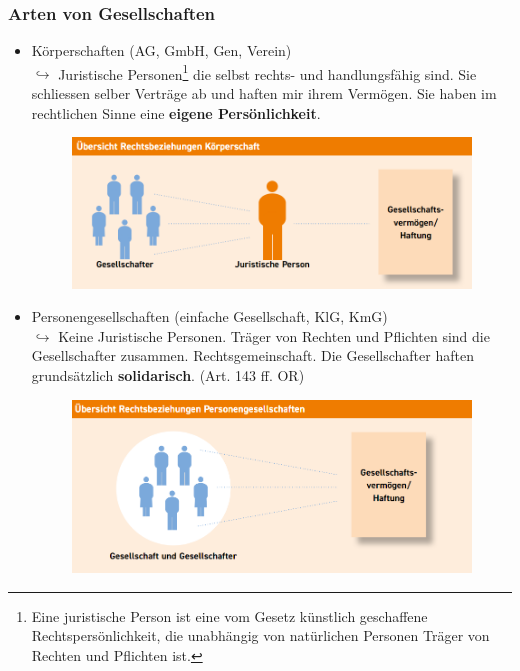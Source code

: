 \documentclass[12pt]{article}
\begin{document}
\newpage
\subsubsection{Arten von Gesellschaften}
\begin{itemize}
    \item Körperschaften (AG, GmbH, Gen, Verein)\\
    $\hookrightarrow$ Juristische Personen\footnote{Eine juristische Person ist eine vom Gesetz künstlich geschaffene Rechtspersönlichkeit, die unabhängig von natürlichen Personen Träger von Rechten und Pflichten ist.} die selbst rechts- und handlungsfähig sind. Sie schliessen selber Verträge ab und haften mir ihrem Vermögen. Sie haben im rechtlichen Sinne eine \textbf{eigene Persönlichkeit}.
    \begin{figure}[h]
        \begin{center}
            \includegraphics[scale=0.4]{Korperschaften.png}
        \end{center}
    \end{figure}
    \item Personengesellschaften (einfache Gesellschaft, KlG, KmG)\\
    $\hookrightarrow$ Keine Juristische Personen. Träger von Rechten und Pflichten sind die Gesellschafter zusammen. \textrightarrow Rechtsgemeinschaft. Die Gesellschafter haften grundsätzlich \textbf{solidarisch}. (Art. 143 ff. OR)
    \begin{figure}[h]
        \begin{center}
            \includegraphics[scale=0.4]{Personengesellschaften.png}

\end{center}
\end{figure}
\end{itemize}
\end{document}
